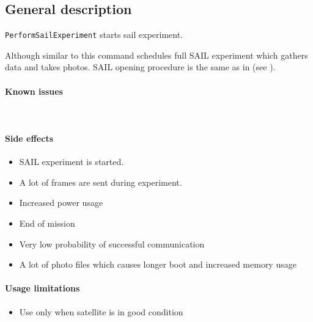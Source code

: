

\subsection{General description}
\texttt{PerformSailExperiment} starts sail experiment. 


Although similar to  this command schedules full SAIL experiment which gathers data and takes photos. SAIL opening procedure is the same as in  (see ).

\paragraph{Known issues} \mbox{} \\ \None

\paragraph{Side effects}
\begin{itemize}
	\item SAIL experiment is started.
	\item A lot of frames are sent during experiment.
	\item Increased power usage
	\item End of mission
	\item Very low probability of successful communication
	\item A lot of photo files which causes longer boot and increased memory usage
\end{itemize}

\paragraph{Usage limitations}
\begin{itemize}
	\item Use only when satellite is in good condition
\end{itemize}

